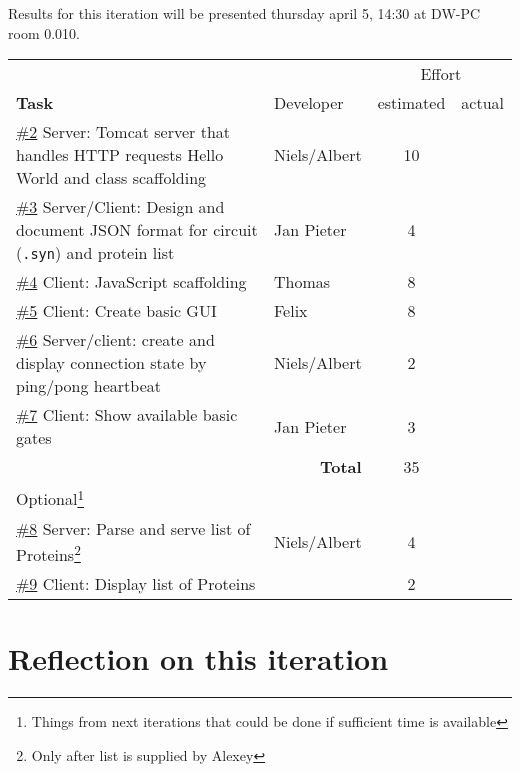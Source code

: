 \documentclass[a4paper]{article}
\newcommand{\githubissue}[1]{\href{https://github.com/FelixAkk/synthbio/issues/#1}{\##1}}
\begin{document}
Results for this iteration will be presented thursday april 5, 14:30 at DW-PC room 0.010.
\vfill
\setlength{\extrarowheight}{3pt}
\centering\begin{tabularx}{\textwidth}{p{10cm} | l | cc}
\multicolumn{2}{c}{}& \multicolumn{2}{c}{Effort} \\	
\textbf{Task} & Developer & estimated & actual \\
\hline
\githubissue{2}
Server: Tomcat server that handles HTTP requests {\sc Hello World} and class scaffolding &
Niels/Albert & 10 & \\

\githubissue{3} Server/Client: Design and document JSON format for circuit (\verb|.syn|) and protein list &
Jan Pieter & 4 & \\

\githubissue{4} Client: JavaScript scaffolding &
Thomas & 8 & \\
 
\githubissue{5} Client: Create basic GUI &
Felix & 8 & \\
 
\githubissue{6} Server/client: create and display connection state by ping/pong heartbeat &
Niels/Albert & 2 & \\
 
\githubissue{7} Client: Show available basic gates &
Jan Pieter & 3 & \\ \hline

\multicolumn{2}{r}{\textbf{Total}  }
 & 35 & \\[8mm]
 
\multicolumn{2}{l}{Optional\footnote{Things from next iterations that could be done if sufficient time is available}} \\ \hline

\githubissue{8} Server: Parse and serve list of Proteins\footnote{Only after list is supplied by Alexey} &
Niels/Albert & 4 & \\

\githubissue{9} Client: Display list of Proteins &
 & 2 & \\
\hline 
\end{tabularx}

\section{Reflection on this iteration}
\end{document}
